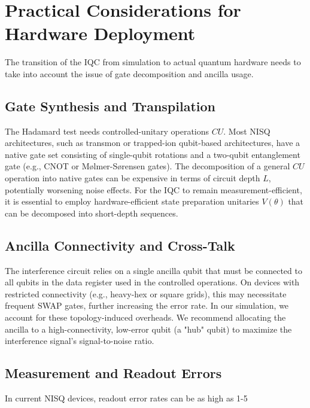 \documentclass[conference]{IEEEtran}
\begin{document}
\section{Practical Considerations for Hardware Deployment}

The transition of the IQC from simulation to actual quantum hardware needs to take into account the issue of gate decomposition and ancilla usage.

\subsection{Gate Synthesis and Transpilation}

The Hadamard test needs controlled-unitary operations $CU$. Most NISQ architectures, such as transmon or trapped-ion qubit-based architectures, have a native gate set consisting of single-qubit rotations and a two-qubit entanglement gate (e.g., CNOT or Mølmer-Sørensen gates). The decomposition of a general $CU$ operation into native gates can be expensive in terms of circuit depth $L$, potentially worsening noise effects. For the IQC to remain measurement-efficient, it is essential to employ hardware-efficient state preparation unitaries $V(\theta)$ that can be decomposed into short-depth sequences.

\subsection{Ancilla Connectivity and Cross-Talk}

The interference circuit relies on a single ancilla qubit that must be connected to all qubits in the data register used in the controlled operations. On devices with restricted connectivity (e.g., heavy-hex or square grids), this may necessitate frequent SWAP gates, further increasing the error rate. In our simulation, we account for these topology-induced overheads. We recommend allocating the ancilla to a high-connectivity, low-error qubit (a "hub" qubit) to maximize the interference signal's signal-to-noise ratio.

\subsection{Measurement and Readout Errors}

In current NISQ devices, readout error rates can be as high as 1-5%
\end{document}
